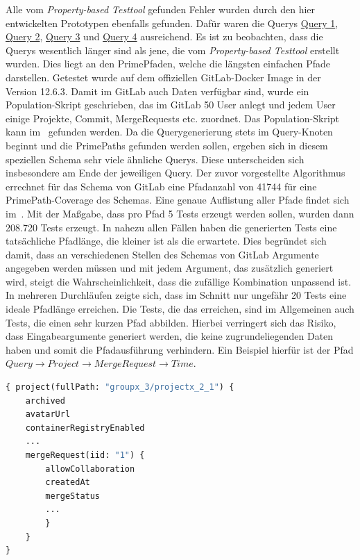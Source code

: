 Alle vom \textit{Property-based Testtool} gefunden Fehler wurden durch den hier entwickelten Prototypen ebenfalls gefunden.
Dafür waren die Querys \hyperref[query1]{Query 1}, \hyperref[query2]{Query 2}, \hyperref[query3]{Query 3} und \hyperref[query4]{Query 4} ausreichend.
Es ist zu beobachten, dass die Querys wesentlich länger sind als jene, die vom \textit{Property-based Testtool} erstellt wurden.
Dies liegt an den PrimePfaden, welche die längsten einfachen Pfade darstellen.
Getestet wurde auf dem offiziellen GitLab-Docker Image in der Version 12.6.3.
Damit im GitLab auch Daten verfügbar sind, wurde ein Population-Skript geschrieben, das im GitLab
50 User anlegt und jedem User einige Projekte, Commit, MergeRequests etc. zuordnet.
Das Population-Skript kann im~\cite[Github]{populationscript} gefunden werden.
Da die Querygenerierung stets im Query-Knoten beginnt und die PrimePaths gefunden werden sollen, ergeben sich in diesem speziellen Schema sehr viele ähnliche Querys.
Diese unterscheiden sich insbesondere am Ende der jeweiligen Query.
Der zuvor vorgestellte Algorithmus errechnet für das Schema von GitLab eine Pfadanzahl von 41744 für eine PrimePath-Coverage des Schemas.
Eine genaue Auflistung aller Pfade findet sich im~\cite[GitHub]{gitlabpaths}.
Mit der Maßgabe, dass pro Pfad 5 Tests erzeugt werden sollen, wurden dann 208.720 Tests erzeugt.
In nahezu allen Fällen haben die generierten Tests eine tatsächliche Pfadlänge, die kleiner ist als die erwartete.
Dies begründet sich damit, dass an verschiedenen Stellen des Schemas von GitLab Argumente angegeben werden müssen
und mit jedem Argument, das zusätzlich generiert wird, steigt die Wahrscheinlichkeit, dass die zufällige Kombination unpassend ist.
In mehreren Durchläufen zeigte sich, dass im Schnitt nur ungefähr 20 Tests eine ideale Pfadlänge erreichen.
Die Tests, die das erreichen, sind im Allgemeinen auch Tests, die einen sehr kurzen Pfad abbilden.
Hierbei verringert sich das Risiko, dass Eingabeargumente generiert werden, die keine zugrundeliegenden Daten haben und somit die Pfadausführung verhindern.
Ein Beispiel hierfür ist der Pfad $Query \rightarrow Project \rightarrow MergeRequest \rightarrow Time$.

\begin{lstlisting}[language=GraphQL]
{ project(fullPath: "groupx_3/projectx_2_1") {
    archived
    avatarUrl
    containerRegistryEnabled
    ...
    mergeRequest(iid: "1") {
        allowCollaboration
        createdAt
        mergeStatus
        ...
        }
    }
}
\end{lstlisting}

